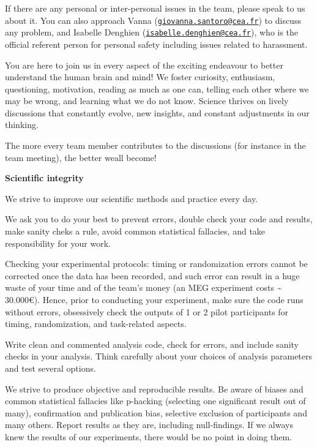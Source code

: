 \documentclass[]{book}
\begin{document}
If there are any personal or inter-personal issues in the team, please speak to us about it. You can also approach Vanna (\href{mailto:giovanna.santoro@cea.fr}{\nolinkurl{giovanna.santoro@cea.fr}}) to discuss any problem, and Isabelle Denghien (\href{mailto:isabelle.denghien@cea.fr}{\nolinkurl{isabelle.denghien@cea.fr}}), who is the official referent person for personal safety including issues related to harassment.

You are here to join us in every aspect of the exciting endeavour to better understand the human brain and mind! We foster curiosity, enthusiasm, questioning, motivation, reading as much as one can, telling each other where we may be wrong, and learning what we do not know. Science thrives on lively discussions that constantly evolve, new insights, and constant adjustments in our thinking.

The more every team member contributes to the discussions (for instance in the team meeting), the better weall become!

\textbf{Scientific integrity}

We strive to improve our scientific methods and practice every day.

We ask you to do your best to prevent errors, double check your code and results, make sanity cheks a rule, avoid common statistical fallacies, and take responsibility for your work.

Checking your experimental protocols: timing or randomization errors cannot be corrected once the data has been recorded, and such error can result in a huge waste of your time and of the team's money (an MEG experiment costs \textasciitilde{} 30.000€). Hence, prior to conducting your experiment, make sure the code runs without errors, obsessively check the outputs of 1 or 2 pilot participants for timing, randomization, and task-related aspects.

Write clean and commented analysis code, check for errors, and include sanity checks in your analysis. Think carefully about your choices of analysis parameters and test several options.

We strive to produce objective and reproducible results. Be aware of biases and common statistical fallacies like p-hacking (selecting one significant result out of many), confirmation and publication bias, selective exclusion of participants and many others. Report results as they are, including null-findings. If we always knew the results of our experiments, there would be no point in doing them.
\end{document}
